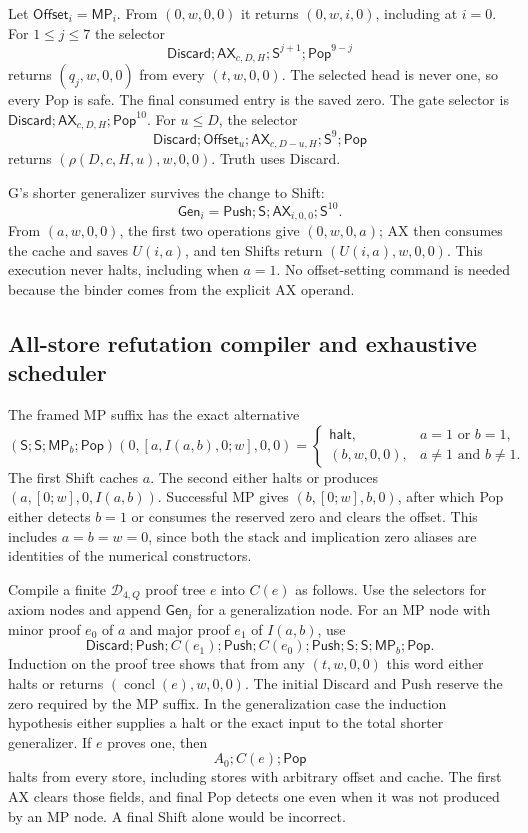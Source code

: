 Let $\mathsf{Offset}_i=\mathsf{MP}_i$. From $(0,w,0,0)$ it returns
$(0,w,i,0)$, including at $i=0$. For $1\le j\le7$ the selector
\[
 \mathsf{Discard};\mathsf{AX}_{c,D,H};\mathsf S^{j+1};
             \mathsf{Pop}^{9-j}
\]
returns $(q_j,w,0,0)$ from every $(t,w,0,0)$. The selected head is never
one, so every Pop is safe. The final consumed entry is the saved zero.
The gate selector is $\mathsf{Discard};\mathsf{AX}_{c,D,H};\mathsf{Pop}^{10}$.
For $u\le D$, the selector
\[
 \mathsf{Discard};\mathsf{Offset}_u;
       \mathsf{AX}_{c,D-u,H};\mathsf S^9;\mathsf{Pop}
\]
returns $(\rho(D,c,H,u),w,0,0)$. Truth uses Discard.

G's shorter generalizer survives the change to Shift:
\[
 \mathsf{Gen}_i=\mathsf{Push};\mathsf S;
                    \mathsf{AX}_{i,0,0};\mathsf S^{10}.
\]
From $(a,w,0,0)$, the first two operations give $(0,w,0,a)$; AX then
consumes the cache and saves $U(i,a)$, and ten Shifts return
$(U(i,a),w,0,0)$. This execution never halts, including when $a=1$.
No offset-setting command is needed because the binder comes from the
explicit AX operand.

\subsection{All-store refutation compiler and exhaustive scheduler}

The framed MP suffix has the exact alternative
\[
 (\mathsf S;\mathsf S;\mathsf{MP}_b;\mathsf{Pop})
         (0,[a,I(a,b),0;w],0,0)
  =\begin{cases}
       \mathsf{halt},&a=1\text{ or }b=1,\\
       (b,w,0,0),&a\ne1\text{ and }b\ne1.
    \end{cases}
\]
The first Shift caches $a$. The second either halts or produces
$(a,[0;w],0,I(a,b))$. Successful MP gives $(b,[0;w],b,0)$, after which
Pop either detects $b=1$ or consumes the reserved zero and clears the
offset. This includes $a=b=w=0$, since both the stack and implication
zero aliases are identities of the numerical constructors.

Compile a finite $\mathcal D_{4,Q}$ proof tree $e$ into $C(e)$ as follows.
Use the selectors for axiom nodes and append $\mathsf{Gen}_i$ for a
generalization node. For an MP node with minor proof $e_0$ of $a$ and major
proof $e_1$ of $I(a,b)$, use
\[
 \mathsf{Discard};\mathsf{Push};C(e_1);\mathsf{Push};
 C(e_0);\mathsf{Push};\mathsf S;\mathsf S;\mathsf{MP}_b;\mathsf{Pop}.
\]
Induction on the proof tree shows that from any $(t,w,0,0)$ this word either
halts or returns $(\operatorname{concl}(e),w,0,0)$. The initial Discard and
Push reserve the zero required by the MP suffix. In the generalization case
the induction hypothesis either supplies a halt or the exact input to the
total shorter generalizer. If $e$ proves one, then
\[
                         A_0;C(e);\mathsf{Pop}
\]
halts from every store, including stores with arbitrary offset and cache.
The first AX clears those fields, and final Pop detects one even when it
was not produced by an MP node. A final Shift alone would be incorrect.

